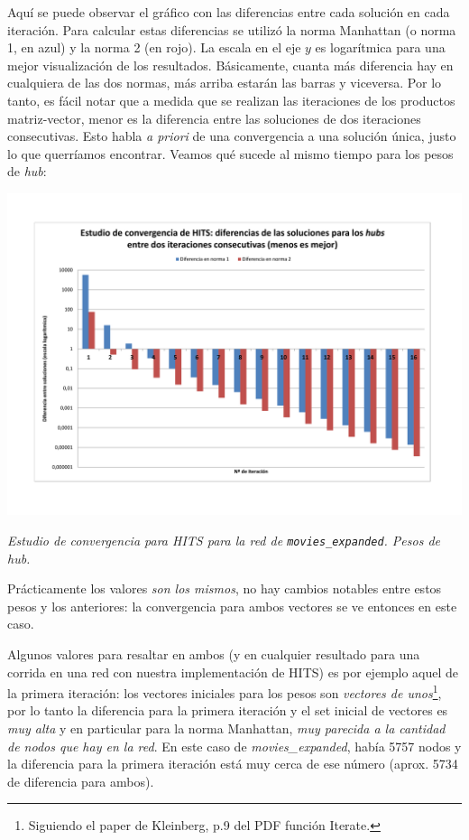 	Aquí se puede observar el gráfico con las diferencias entre cada solución en cada iteración. Para calcular estas diferencias se utilizó la norma Manhattan (o norma 1, en azul) y la norma 2 (en rojo). La escala en el eje $y$ es logarítmica para una mejor visualización de los resultados. Básicamente, cuanta más diferencia hay en cualquiera de las dos normas, más arriba estarán las barras y viceversa. Por lo tanto, es fácil notar que a medida que se realizan las iteraciones de los productos matriz-vector, menor es la diferencia entre las soluciones de dos iteraciones consecutivas. Esto habla \textit{a priori} de una convergencia a una solución única, justo lo que querríamos encontrar. Veamos qué sucede al mismo tiempo para los pesos de \textit{hub}:
	\par 
	\begin{center}
		\includegraphics[scale=0.12]{./img/graficoHubsMovies.png}
		\par
		\footnotesize\textit{Estudio de convergencia para HITS para la red de \texttt{movies\_expanded}. Pesos de hub.}
	\end{center}
	\par 
	
	Prácticamente los valores \textit{son los mismos}, no hay cambios notables entre estos pesos y los anteriores: la convergencia para ambos vectores se ve entonces en este caso.
	
	Algunos valores para resaltar en ambos (y en cualquier resultado para una corrida en una red con nuestra implementación de HITS) es por ejemplo aquel de la primera iteración: los vectores iniciales para los pesos son \textit{vectores de unos}\footnote{Siguiendo el paper de Kleinberg, p.9 del PDF función Iterate.}, por lo tanto la diferencia para la primera iteración y el set inicial de vectores es \textit{muy alta} y en particular para la norma Manhattan, \textit{muy parecida a la cantidad de nodos que hay en la red}. En este caso de \textit{movies\_expanded}, había 5757 nodos y la diferencia para la primera iteración está muy cerca de ese número (aprox. 5734 de diferencia para ambos).
	
